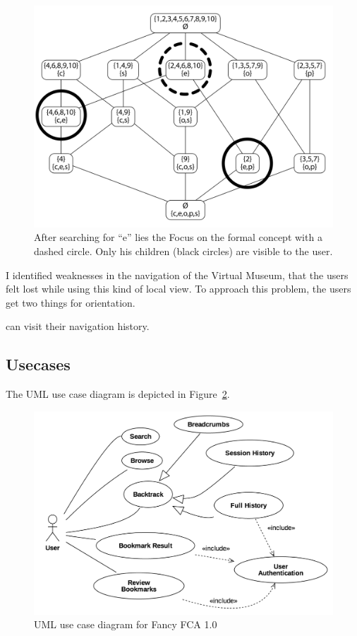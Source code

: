 \documentclass[11pt]{report}
\begin{document}
\begin{figure}[!ht]
	\centering
	\includegraphics[width=\linewidth]{images/focus}
\caption{After searching for ``e'' lies the Focus on the formal concept with a dashed circle. Only his children (black circles) are visible to the user. }
\label{figure:conceptExample}
\end{figure}

I identified weaknesses in the navigation of the Virtual Museum, that the users felt lost while using this kind of local view. To approach this problem, the users get two things for orientation.   


can visit their navigation history. 


\subsection{Usecases}
The UML use case diagram is depicted in Figure~\ref{figure:usecase}.

\begin{figure}[!ht]
	\centering
	\includegraphics[width=\linewidth]{images/usecase}
\caption{UML use case diagram for Fancy FCA 1.0}
\label{figure:usecase}
\end{figure}
\end{document}
